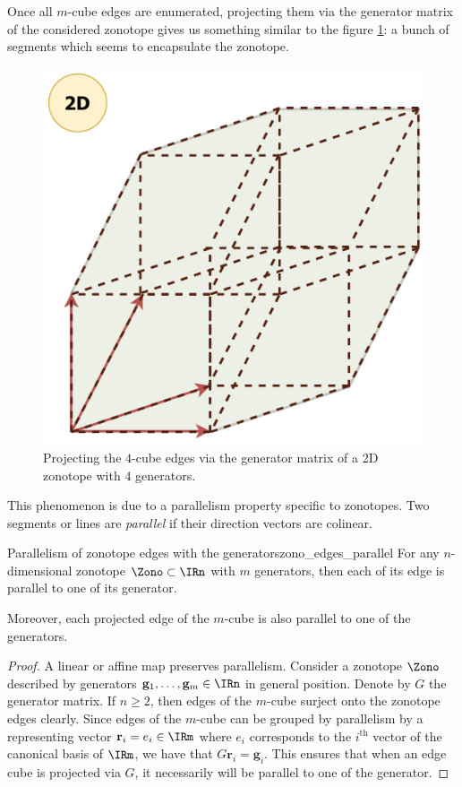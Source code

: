 Once all $m$-cube edges are enumerated, projecting them via the generator matrix of the considered zonotope gives us something similar to the figure \ref{fig:from_cube_edges_to_zonotope_edges}: a bunch of segments which seems to encapsulate the zonotope.

\begin{figure}[!htb]
    \captionsetup{justification=centering}
    \centering
    \includegraphics[trim={0 0 0 0},clip, width=0.3\linewidth]{img/chapter_2/zonotope_after_cube_duplication.pdf}
    \caption{Projecting the $4$-cube edges via the generator matrix of a 2D zonotope with $4$ generators.}
    \label{fig:from_cube_edges_to_zonotope_edges}
\end{figure}

This phenomenon is due to a parallelism property specific to zonotopes. Two segments or lines are \emph{parallel} if their direction vectors are colinear.

\begin{lemmabox}{Parallelism of zonotope edges with the generators}{zono_edges_parallel}
    For any $n$-dimensional zonotope $\Zono \subset \IRn$ with $m$ generators, then each of its edge is parallel to one of its generator.

    Moreover, each projected edge of the $m$-cube is also parallel to one of the generators.
\end{lemmabox}
\begin{proof}
A linear or affine map preserves parallelism. 
Consider a zonotope $\Zono$ described by generators $\mathbf{g}_1,\dots,\mathbf{g}_m \in \IRn$ in general position. Denote by $G$ the generator matrix. If $n\geq 2$, then edges of the $m$-cube surject onto the zonotope edges clearly.
Since edges of the $m$-cube can be grouped by parallelism by a representing vector $\mathbf{r}_i = e_i \in \IRm$ where $e_i$ corresponds to the $i^{\text{th}}$ vector of the canonical basis of $\IRm$, we have that $G\mathbf{r}_i = \mathbf{g}_i$. This ensures that when an edge cube is projected via $G$, it necessarily will be parallel to one of the generator.
\end{proof}

